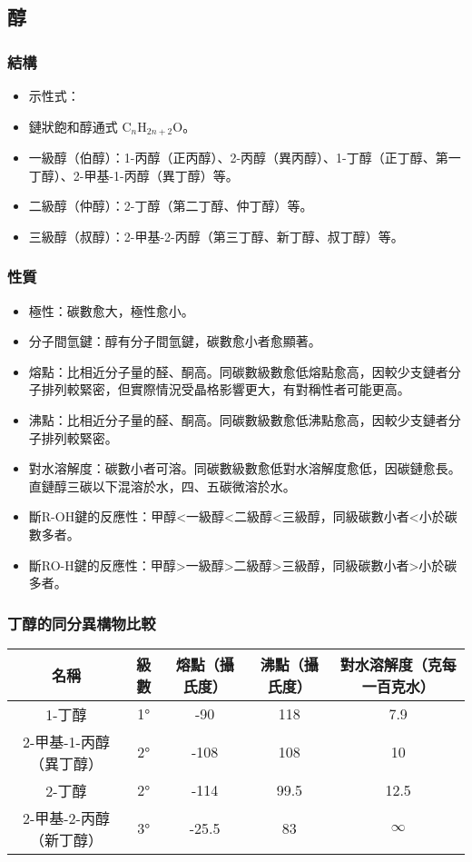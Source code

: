 \documentclass[a4paper,12pt]{report}
\begin{document}
\begin{itemize}
\subsection{醇}
\subsubsection{結構}
\begin{itemize}
\item 示性式：
\item 鏈狀飽和醇通式 C$_n$H$_{2n+2}$O。
\item 一級醇（伯醇）：1-丙醇（正丙醇）、2-丙醇（異丙醇）、1-丁醇（正丁醇、第一丁醇）、2-甲基-1-丙醇（異丁醇）等。
\item 二級醇（仲醇）：2-丁醇（第二丁醇、仲丁醇）等。
\item 三級醇（叔醇）：2-甲基-2-丙醇（第三丁醇、新丁醇、叔丁醇）等。
\end{itemize}
\subsubsection{性質}
\begin{itemize}
\item 極性：碳數愈大，極性愈小。
\item 分子間氫鍵：醇有分子間氫鍵，碳數愈小者愈顯著。
\item 熔點：比相近分子量的醛、酮高。同碳數級數愈低熔點愈高，因較少支鏈者分子排列較緊密，但實際情況受晶格影響更大，有對稱性者可能更高。
\item 沸點：比相近分子量的醛、酮高。同碳數級數愈低沸點愈高，因較少支鏈者分子排列較緊密。
\item 對水溶解度：碳數小者可溶。同碳數級數愈低對水溶解度愈低，因碳鏈愈長。直鏈醇三碳以下混溶於水，四、五碳微溶於水。
\item 斷R-OH鍵的反應性：甲醇<一級醇<二級醇<三級醇，同級碳數小者<小於碳數多者。
\item 斷RO-H鍵的反應性：甲醇>一級醇>二級醇>三級醇，同級碳數小者>小於碳多者。
\end{itemize}
\subsubsection{丁醇的同分異構物比較}
\begin{longtable}[c]{|c|c|c|c|c|}
\hline
名稱 & 級數 & 熔點（攝氏度） & 沸點（攝氏度） & 對水溶解度（克每一百克水）\\\hline\endhead
1-丁醇 & 1° & -90 & 118 & 7.9\\\hline
2-甲基-1-丙醇（異丁醇） & 2° & -108 & 108 & 10\\\hline
2-丁醇 & 2° & -114 & 99.5 & 12.5\\\hline
2-甲基-2-丙醇（新丁醇） & 3° & -25.5 & 83 & $\infty$\\\hline
\end{longtable}\FB

\end{itemize}
\end{document}
